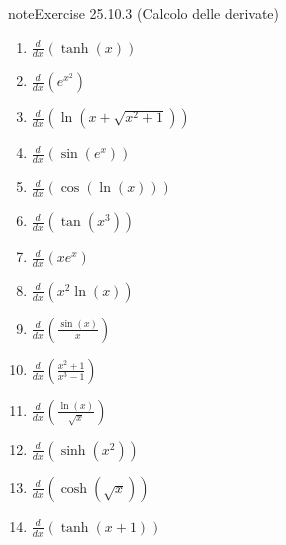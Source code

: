 \documentclass[letterpaper,10pt,italian]{jupyterBook}
\begin{document}
\begin{sphinxadmonition}{note}{Exercise 25.10.3 (Calcolo delle derivate)}
\begin{enumerate}
\item {} 
\sphinxAtStartPar
\(\frac{d}{dx} \left(\tanh(x)\right)\)

\item {} 
\sphinxAtStartPar
\(\frac{d}{dx} \left(e^{x^2}\right)\)

\item {} 
\sphinxAtStartPar
\(\frac{d}{dx} \left(\ln(x + \sqrt{x^2 + 1})\right)\)

\item {} 
\sphinxAtStartPar
\(\frac{d}{dx} \left(\sin(e^x)\right)\)

\item {} 
\sphinxAtStartPar
\(\frac{d}{dx} \left(\cos(\ln(x))\right)\)

\item {} 
\sphinxAtStartPar
\(\frac{d}{dx} \left(\tan(x^3)\right)\)

\item {} 
\sphinxAtStartPar
\(\frac{d}{dx} \left(x e^x\right)\)

\item {} 
\sphinxAtStartPar
\(\frac{d}{dx} \left(x^2 \ln(x)\right)\)

\item {} 
\sphinxAtStartPar
\(\frac{d}{dx} \left(\frac{\sin(x)}{x}\right)\)

\item {} 
\sphinxAtStartPar
\(\frac{d}{dx} \left(\frac{x^2 + 1}{x^3 - 1}\right)\)

\item {} 
\sphinxAtStartPar
\(\frac{d}{dx} \left(\frac{\ln(x)}{\sqrt{x}}\right)\)

\item {} 
\sphinxAtStartPar
\(\frac{d}{dx} \left(\sinh(x^2)\right)\)

\item {} 
\sphinxAtStartPar
\(\frac{d}{dx} \left(\cosh(\sqrt{x})\right)\)

\item {} 
\sphinxAtStartPar
\(\frac{d}{dx} \left(\tanh(x + 1)\right)\)

\end{enumerate}
\end{sphinxadmonition}
 \label{exercise:ch/infinitesimal_calculus/derivatives-problems-exercise-3}
\end{document}
